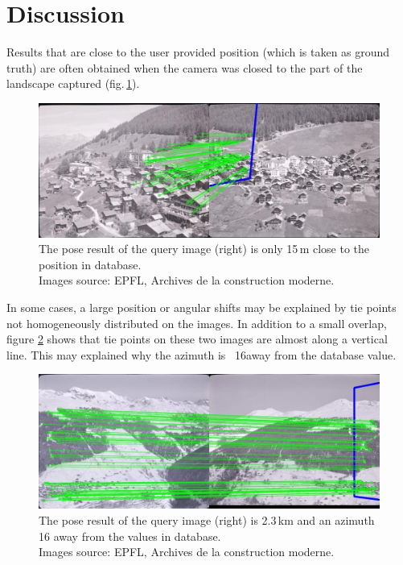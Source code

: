 \documentclass[fleqn,10pt]{wlpeerj} %
\begin{document}
\section*{Discussion}
Results that are close to the user provided position (which is taken as ground truth) 
are often obtained when the camera was closed to the part of the landscape 
captured (fig.\,\ref{ex1}).

\begin{figure}[H]
\centering
\includegraphics[width=0.8\linewidth]{ex1.jpg}
\caption[These two images show a pose result that is 15\,m to the position in database.]
{The pose result of the query image (right) is only 15\,m close to the position in database.\\
Images source: EPFL, Archives de la construction moderne.}
\label{ex1}
\end{figure}


In some cases, a large position or angular shifts may be explained by tie points 
not homogeneously distributed on the images. In addition to a small overlap,
figure \ref{ex3} shows that tie points on these two images are almost along a 
vertical line. This may explained why the azimuth is ~16\textdegree away from the
database value.


\begin{figure}[H]
\centering
\includegraphics[width=0.8\linewidth]{ex3.jpg}
\caption[These two images show a pose result that is 2.3\,km and an azimuth that is 16\textdegree 
away from the position in database.]
{The pose result of the query image (right) is 2.3\,km and an azimuth 16\textdegree 
away from the values in database. \\
Images source: EPFL, Archives de la construction moderne.}
\label{ex3}
\end{figure}
\end{document}

